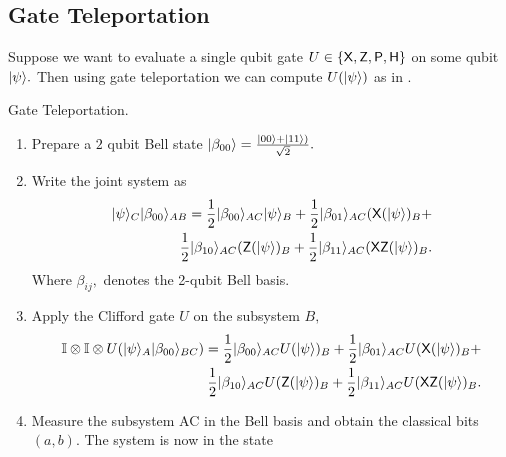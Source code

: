 \subsection{Gate Teleportation}
\label{protocol: gate-teleportation}
Suppose we want to evaluate a single qubit gate $U\in\{{\sf X}, {\sf Z}, {\sf P},{\sf H}\}$ on some qubit ${\lvert}\psi\rangle.$ Then using gate teleportation  \cite{GC99} we can compute $U ({\lvert}\psi\rangle)$ as in .
\begin{algorithm}[]
\caption{Gate Teleportation.}
\label{algo:gate-teleport}
\begin{enumerate}
\item  Prepare a $2$ qubit Bell state ${\lvert}\beta_{00}\rangle=\frac{{\lvert}00\rangle+{\lvert}11\rangle)}{\sqrt{2}}.$
\item Write the joint system as
 \begin{equation*}
 \label{eq:telepprtation1}
 \begin{aligned}
{\lvert}\psi\rangle_C {\lvert}\beta_{00}\rangle_{AB}=\frac{1}{2}{\lvert}\beta_{00}\rangle_{AC} {\lvert}\psi\rangle_{B} + \frac{1}{2}{\lvert}\beta_{01}\rangle_{AC} ( {\sf X}( {\lvert}\psi\rangle)_{B}  +\\
 \frac{1}{2}{\lvert}\beta_{10}\rangle_{AC} ( {\sf Z}( {\lvert}\psi\rangle)_{B} + \frac{1}{2}{\lvert}\beta_{11}\rangle_{AC} ( {\sf X} {\sf Z}( {\lvert}\psi\rangle)_{B}.
\end{aligned}
\end{equation*}
 Where $\beta_{ij},$  denotes the 2-qubit Bell basis.
\item Apply the Clifford gate $U$ on the subsystem $B,$
 \begin{equation*}
  \label{eq:telepprtation2}
 \begin{aligned}
\mathbb{I}\otimes \mathbb{I} \otimes U({\lvert}\psi\rangle_A {\lvert}\beta_{00}\rangle_{BC})=\frac{1}{2}{\lvert}\beta_{00}\rangle_{AC} U({\lvert}\psi\rangle)_{B}+ \frac{1}{2}{\lvert}\beta_{01}\rangle_{AC}U( {\sf X}( {\lvert}\psi\rangle)_{B} +\\ \frac{1}{2}{\lvert}\beta_{10}\rangle_{AC}U( {\sf Z}( {\lvert}\psi\rangle)_{B}+ \frac{1}{2}{\lvert}\beta_{11}\rangle_{AC}U( {\sf X} {\sf Z}( {\lvert}\psi\rangle)_{B}.
\end{aligned}
 \end{equation*}
 \item Measure the subsystem AC  in the Bell basis and obtain the classical bits $(a,b).$ The system is now in the state

\end{enumerate}
\end{algorithm}
